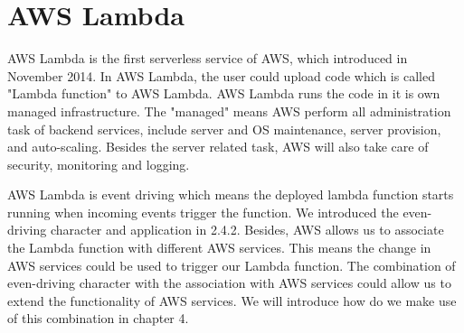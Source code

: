 \section{AWS Lambda}
AWS Lambda is the first serverless service of AWS,
which introduced in November 2014. In AWS Lambda, the user could upload code which is called "Lambda function" to AWS Lambda. AWS Lambda runs the code in it is own managed infrastructure. The "managed" means AWS perform all administration task of backend services, include server and OS maintenance, server provision, and auto-scaling. Besides the server related task, AWS will also take care of security, monitoring and logging.
\par
 AWS Lambda is event driving which means the deployed lambda function starts running when incoming events trigger the function. We introduced the even-driving character and application in 2.4.2. Besides, AWS allows us to associate the Lambda function with different AWS services. This means the change in AWS services could be used to trigger our Lambda function. The combination of even-driving character with the association with AWS services could allow us to extend the functionality of AWS services. We will introduce how do we make use of this combination in chapter 4.
